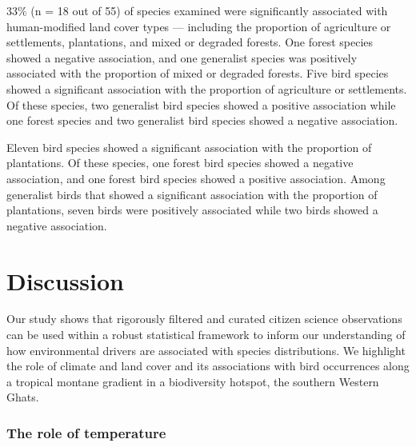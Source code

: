 33\% (n = 18 out of 55) of species examined were significantly associated with human-modified land cover types --- including the proportion of agriculture or settlements, plantations, and mixed or degraded forests.
One forest species showed a negative association, and one generalist species was positively associated with the proportion of mixed or degraded forests.
Five bird species showed a significant association with the proportion of agriculture or settlements.
Of these species, two generalist bird species showed a positive association while one forest species and two generalist bird species showed a negative association.

Eleven bird species showed a significant association with the proportion of plantations.
Of these species, one forest bird species showed a negative association, and one forest bird species showed a positive association.
Among generalist birds that showed a significant association with the proportion of plantations, seven birds were positively associated while two birds showed a negative association.

\section*{Discussion}

Our study shows that rigorously filtered and curated citizen science observations can be used within a robust statistical framework to inform our understanding of how environmental drivers are associated with species distributions.
We highlight the role of climate and land cover and its associations with bird occurrences along a tropical montane gradient in a biodiversity hotspot, the southern Western Ghats.

\subsubsection*{The role of temperature}

